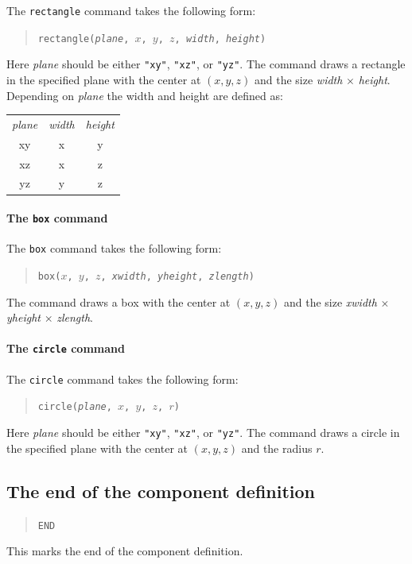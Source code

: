 The {\tt rectangle} command takes the following form:
\begin{quote}
  \texttt{rectangle({\it plane}, $x$, $y$, $z$, {\it width}, {\it height})}
\end{quote}
Here {\it plane} should be either \verb+"xy"+, \verb+"xz"+, or
\verb+"yz"+. The command draws a rectangle in the specified plane with
the center at $(x, y, z)$ and the size {\it width} $\times$ {\it
height}. Depending on {\it plane} the width and height are defined as:\\
\begin{tabular} {ccc}
  {\it plane} & {\it width} & {\it height} \\
  xy & x & y \\
  xz & x & z \\
  yz & y & z \\
 \end{tabular}

\paragraph{The {\tt box} command}

The {\tt box} command takes the following form:
\begin{quote}
  \texttt{box($x$, $y$, $z$, {\it xwidth}, {\it yheight}, {\it zlength})}
\end{quote}
The command draws a box with the center at $(x, y, z)$ and the size {\it xwidth} $\times$ {\it yheight} $\times$ {\it zlength}.

\paragraph{The {\tt circle} command}

The {\tt circle} command takes the following form:
\begin{quote}
  \texttt{circle({\it plane}, $x$, $y$, $z$, $r$)}
\end{quote}
Here {\it plane} should be either \verb+"xy"+, \verb+"xz"+, or
\verb+"yz"+. The command draws a circle in the specified plane with the center
 at $(x, y, z)$ and the radius $r$.



\subsection{The end of the component definition}

\begin{quote}
  \texttt{END}
\end{quote}
This marks the end of the component definition.

